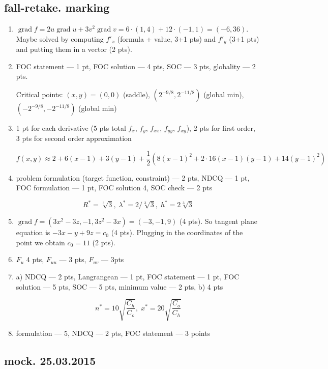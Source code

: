 \documentclass[12pt]{article} %
\theoremstyle{definition} %
\DeclareMathOperator{\grad}{grad}
\providecommand{\grad}{\mathrm{grad}\,}
\begin{document}
\subsection{fall-retake. marking}
\begin{enumerate}
\item $\grad f =2u \grad u + 3v^2 \grad v = 6\cdot (1,4)+12\cdot (-1,1)=(-6,36)$. Maybe solved by computing $f'_x$ (formula + value, 3+1 pts) and $f'_y$ (3+1 pts) and putting them in a vector (2 pts).
\item FOC statement --- 1 pt, FOC solution --- 4 pts, SOC --- 3 pts, globality --- 2 pts.

Critical points: $(x,y)=(0,0)$ (saddle), $(2^{-9/8},2^{-11/8})$ (global min), $(-2^{-9/8},-2^{-11/8})$ (global min)

\item 1 pt for each derivative (5 pts total $f_x$, $f_y$, $f_{xx}$, $f_{yy}$, $f_{xy}$), 2 pts for first order, 3 pts for second order approximation

\[
f(x,y)\approx 2 + 6(x-1) + 3(y-1) + \frac{1}{2} (8(x-1)^2 + 2\cdot 16(x-1)(y-1)+14(y-1)^2)
\]

\item problem formulation (target function, constraint) --- 2 pts, NDCQ --- 1 pt, FOC formulation --- 1 pt, FOC solution 4, SOC check --- 2 pts

\[
R^*=\sqrt[3]{3}, \; \lambda^*=2/\sqrt[3]{3}, \; h^*=2\sqrt[3]{3}
\]

\item $\grad f = (3x^2-3z,-1,3z^2-3x)=(-3,-1,9)$ (4 pts). So tangent plane equation is $-3x-y+9z=c_0$ (4 pts). Plugging in the coordinates of the point we obtain $c_0=11$ (2 pts).

\item $F_u$ 4 pts, $F_{uu}$ --- 3 pts, $F_{uv}$ --- 3pts

\item a) NDCQ --- 2 pts, Langrangean --- 1 pt,  FOC statement --- 1 pt, FOC solution --- 5 pts, SOC --- 5 pts, minimum value --- 2 pts, b) 4 pts

\[
n^*=10\sqrt{\frac{C_h}{C_o}}, \; x^*=20\sqrt{\frac{C_o}{C_h}}
\]

\item formulation --- 5, NDCQ --- 2 pts, FOC statement --- 3 points

\end{enumerate}

\subsection{mock. 25.03.2015}
\end{document}
